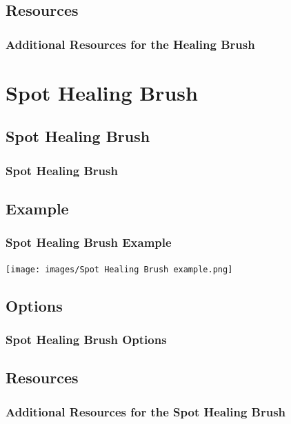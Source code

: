 \documentclass{beamer}
\begin{document}
\subsection{Resources}		
	\begin{frame}
		\frametitle{Additional Resources for the Healing Brush}
		\begin{outline}
			\1 
		\end{outline}
	\end{frame}


\section{Spot Healing Brush}

\subsection{Spot Healing Brush}		

\begin{frame}
	\frametitle{Spot Healing Brush}
	\begin{outline}
		\1 
	\end{outline}
\end{frame}

\subsection{Example}		
\begin{frame}
	\frametitle{Spot Healing Brush Example}
	\begin{center}
		\texttt{[image: images/Spot Healing Brush example.png]}
	\end{center}
\end{frame}

\subsection{Options}		
\begin{frame}
	\frametitle{Spot Healing Brush Options}
	\begin{outline}
		\1 
	\end{outline}
\end{frame}

\subsection{Resources}		
\begin{frame}
	\frametitle{Additional Resources for the Spot Healing Brush}
	\begin{outline}
		\1 
		\2 
		\2
	\end{outline}
\end{frame}
	
\end{document}
